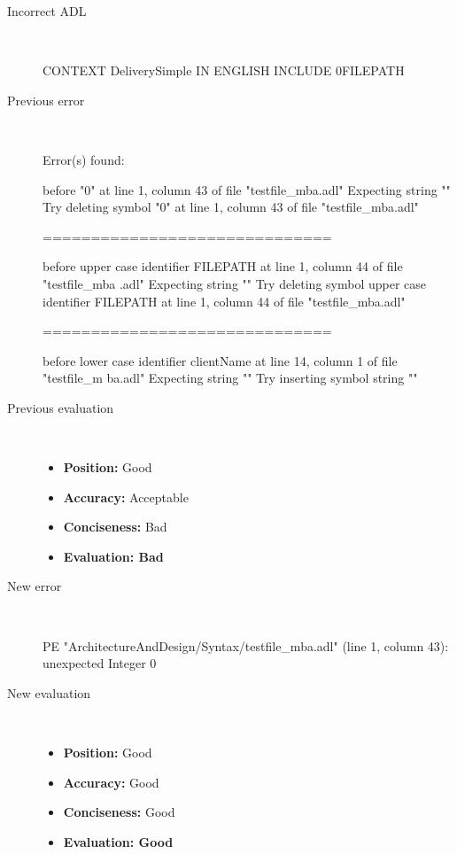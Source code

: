 \begin{description}
  \item[Incorrect ADL]~\\
\begin{adl}
CONTEXT DeliverySimple IN ENGLISH INCLUDE 0FILEPATH\end{adl}
  \item[Previous error]~\\
\begin{haskell}
Error(s) found:

before "0" at line 1, column 43 of file "testfile_mba.adl"
Expecting string ""
Try deleting symbol "0" at line 1, column 43 of file "testfile_mba.adl"

==============================

before upper case identifier FILEPATH at line 1, column 44 of file "testfile_mba
.adl"
Expecting string ""
Try deleting symbol upper case identifier FILEPATH at line 1, column 44 of file
"testfile_mba.adl"

==============================

before lower case identifier clientName at line 14, column 1 of file "testfile_m
ba.adl"
Expecting string ""
Try inserting symbol string ""
\end{haskell}
  \item[Previous evaluation]~\\
    \begin{itemize}
    \item \textbf{Position:} Good
    \item \textbf{Accuracy:} Acceptable
    \item \textbf{Conciseness:} Bad
    \item \textbf{Evaluation: Bad}
    \end{itemize}
  \item[New error]~\\
\begin{haskell}
PE "ArchitectureAndDesign/Syntax/testfile_mba.adl" (line 1, column 43):
unexpected Integer 0\end{haskell}
  \item[New evaluation]~\\
    \begin{itemize}
    \item \textbf{Position:} Good
    \item \textbf{Accuracy:} Good
    \item \textbf{Conciseness:} Good
    \item \textbf{Evaluation: Good}
    \end{itemize}
  \end{description}

